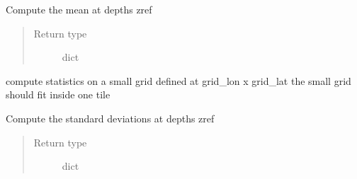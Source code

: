 \documentclass[letterpaper,10pt,english]{sphinxmanual}
\begin{document}
\begin{fulllineitems}
\label{\detokenize{pargopy:pargopy.stats.compute_mean_at_zref}}
Compute the mean at depths zref
\begin{quote}\begin{description}
\item[{Return type}] \leavevmode
dict

\end{description}\end{quote}

\end{fulllineitems}


\begin{fulllineitems}
\label{\detokenize{pargopy:pargopy.stats.compute_stats_at_zref}}
compute statistics on a small grid defined at grid\_lon x grid\_lat
the small grid should fit inside one tile

\end{fulllineitems}


\begin{fulllineitems}
\label{\detokenize{pargopy:pargopy.stats.compute_std_at_zref}}
Compute the standard deviations at depths zref
\begin{quote}\begin{description}
\item[{Return type}] \leavevmode
dict

\end{description}\end{quote}

\end{fulllineitems}

\end{document}
